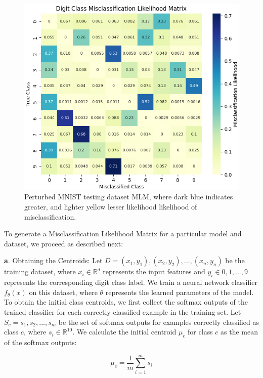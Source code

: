 \begin{figure}[h]
    \centering
    \includegraphics[width=0.99\columnwidth]{Figures/DigitClassMisclassificationLikelihoodMatrix.png}   %
    \caption{Perturbed MNIST testing dataset MLM, where dark blue indicates greater, and lighter yellow lesser likelihood likelihood of misclassification.}
    \label{fig:DigitClassMisclassificationLikelihoodMatrix}
\end{figure}

To generate a Misclassification Likelihood Matrix for a particular model and dataset, we proceed as described next:

\textbf{a}. Obtaining the Centroids:
Let $ D = {(x_1, y_1), (x_2, y_2), ..., (x_n, y_n)} $ be the training dataset, where $ x_i \in \mathbb{R}^d $ represents the input features and $y_i \in {0, 1, ..., 9}$ represents the corresponding digit class label. We train a neural network classifier $f_\theta(x)$ on this dataset, where $\theta$ represents the learned parameters of the model.
To obtain the initial class centroids, we first collect the softmax outputs of the trained classifier for each correctly classified example in the training set. Let $S_c = {s_1, s_2, ..., s_m}$ be the set of softmax outputs for examples correctly classified as class $c$, where $s_i \in \mathbb{R}^{10}$. We calculate the initial centroid $\mu_c$ for class $c$ as the mean of the softmax outputs:

\begin{equation}
\mu_c = \frac{1}{m} \sum_{i=1}^m s_i
\label{eq:mean_softmax_output}
\end{equation}

